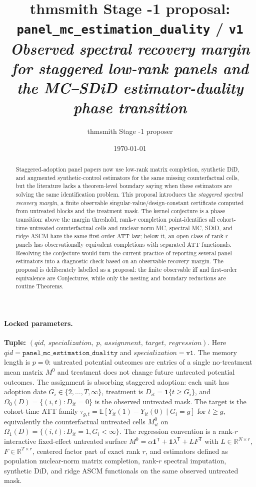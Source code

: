 \documentclass[11pt]{article}
\title{thmsmith Stage -1 proposal: \texttt{panel\_mc\_estimation\_duality} / \texttt{v1}%
  \\ \large\textit{Observed spectral recovery margin for staggered low-rank panels and the MC--SDiD estimator-duality phase transition}}
\author{thmsmith Stage -1 proposer}
\date{\today}
\newcommand{\E}{\mathbb{E}}
\newcommand{\one}{\mathbf{1}}
\newcommand{\transpose}{\mathsf{T}}
\newcommand{\R}{\mathbb{R}}
\theoremstyle{definition}
\theoremstyle{plain}
\theoremstyle{remark}
\begin{document}
\maketitle


\paragraph{Locked parameters.}
\textbf{Tuple:} $(qid,\ specialization,\ p,\ assignment,\ target,\ regression)$.
Here $qid=\texttt{panel\_mc\_estimation\_duality}$ and
$specialization=\texttt{v1}$. The memory length is $p=0$: untreated potential
outcomes are entries of a single no-treatment mean matrix $M^0$ and treatment
does not change future untreated potential outcomes. The assignment is
absorbing staggered adoption: each unit has adoption date $G_i\in
\{2,\ldots,T,\infty\}$, treatment is $D_{it}=\one\{t\ge G_i\}$, and
$\Omega_0(D)=\{(i,t):D_{it}=0\}$ is the observed untreated mask. The target is
the cohort-time ATT family
$\tau_{g,t}=\E[Y_{it}(1)-Y_{it}(0)\mid G_i=g]$ for $t\ge g$, equivalently the
counterfactual untreated cells $M^0_{it}$ on
$\Omega_1(D)=\{(i,t):D_{it}=1,G_i<\infty\}$. The regression convention is a
rank-$r$ interactive fixed-effect untreated surface
$M^0=\alpha\one^\transpose+\one\lambda^\transpose+L F^\transpose$ with
$L\in\R^{N\times r}$, $F\in\R^{T\times r}$, centered factor part of exact rank
$r$, and estimators defined as population nuclear-norm matrix completion,
rank-$r$ spectral imputation, synthetic DiD, and ridge ASCM functionals on the
same observed untreated mask.

\begin{abstract}
Staggered-adoption panel papers now use low-rank matrix completion, synthetic
DiD, and augmented synthetic-control estimators for the same missing
counterfactual cells, but the literature lacks a theorem-level boundary saying
when these estimators are solving the same identification problem. This
proposal introduces the \emph{staggered spectral recovery margin}, a finite
observable singular-value/design-constant certificate computed from untreated
blocks and the treatment mask. The kernel conjecture is a phase transition:
above the margin threshold, rank-$r$ completion point-identifies all
cohort-time untreated counterfactual cells and nuclear-norm MC, spectral MC,
SDiD, and ridge ASCM have the same first-order ATT law; below it, an open class
of rank-$r$ panels has observationally equivalent completions with separated
ATT functionals. Resolving the conjecture would turn the current practice of
reporting several panel estimators into a diagnostic check based on an
observable recovery margin. The proposal is deliberately labelled as a
proposal: the finite observable iff and first-order equivalence are
Conjectures, while only the nesting and boundary reductions are routine
Theorems.
\end{abstract}
\end{document}
